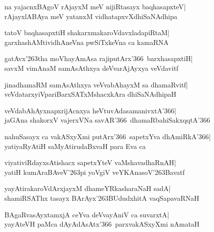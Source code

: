 \documentclass[twoside,12pt,openright]{book}
\def\S{\char'263}
\newcounter{shloka}[chapter]
\begin{document}
\begin{shloka}%
na yajacnxBAgoV rAjayxM meV nijiRtasayx baqhasapxteV|\\
rAjayxlABAya meV yatanxM vidhatapxvXdhiSaNAdhipa
\end{shloka}

\begin{shloka}%
tatoV baqhasapxtiH shakarxmakaroVdavxladapiRtaM|\\
garxhashAMtividhAneVna pwSiTxkeVna ca kamaRNA
\end{shloka}

\begin{shloka}%
gatAvx\S tha moVhayAmAsa rajiputArx\char'366\ barxhasapxtiH|\\
savxM vimAnaM samAsAthxya deVvarAjAyxya veVdavitf
\end{shloka}

\begin{shloka}%
jinadhamaRM samAsAthxya veVvabAhayxM sa dhamaRvitf|\\
veVdatarxyiVpariBarxSATxMshacxkAra dhiSaNAdhipaH
\end{shloka}

\begin{shloka}%
veVdabAhAyxnapxrijAcnxya heVtuvAdasamanivxtA\char'366|\\
jaGAna shakorxV vajerxVNa savAR\char'366\ dhamaRbahiSakxqqtA\char'366
\end{shloka}

\begin{shloka}%
nahuSasayx ca vakASxyXmi putArx\char'366\ sapetxYva
dhAmiRkA\char'366|\\
yatiyaRyAtiH saMyAtirudaBxvaH para Eva ca
\end{shloka}

\begin{shloka}%
viyativiRdayxsAtishacx sapetxYteV vaMshavadhaRnAH|\\
yatiH kumAraBAveV\S pi yoVgiV veYKAnasoV\S Bavatf
\end{shloka}

\begin{shloka}%
yayAtirakaroVdArxjayxM dhameYRkasharaNaH sadA|\\
shamiRSAThx tasayx BArAyx\S BUdudxhitA vaqSapavaRNaH
\end{shloka}

\begin{shloka}%
BAgaRvasAyxtamxjA ceYva deVvayAniV ca suvarxtA|\\
yayAteVH paMca dAyAdAsAtx\char'366\ parxvakASxyXmi nAmataH
\end{shloka}
\end{document}
